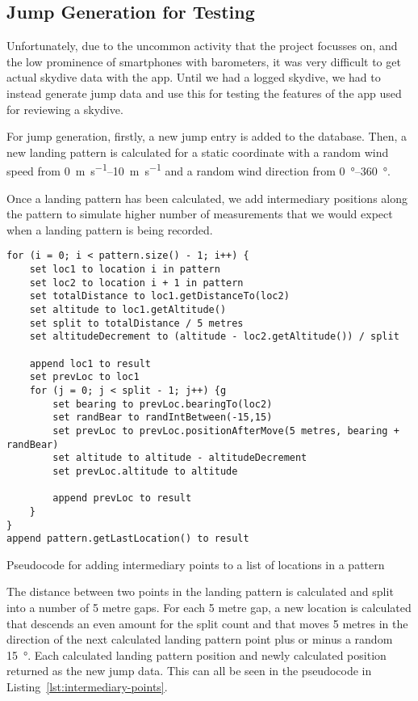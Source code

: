 \subsection{Jump Generation for Testing}
Unfortunately, due to the uncommon activity that the project focusses on, and the low prominence of smartphones with barometers, it was very difficult to get actual skydive data with the app. Until we had a logged skydive, we had to instead generate jump data and use this for testing the features of the app used for reviewing a skydive.

For jump generation, firstly, a new jump entry is added to the database. Then, a new landing pattern is calculated for a static coordinate with a random wind speed from \SIrange{0}{10}{\metre\per\second} and a random wind direction from \SIrange{0}{360}{\degree}.

Once a landing pattern has been calculated, we add intermediary positions along the pattern to simulate higher number of measurements that we would expect when a landing pattern is being recorded.

\begin{listing}
  \centering
  \begin{lstlisting}[style=code]
for (i = 0; i < pattern.size() - 1; i++) {
    set loc1 to location i in pattern
    set loc2 to location i + 1 in pattern
    set totalDistance to loc1.getDistanceTo(loc2)
    set altitude to loc1.getAltitude()
    set split to totalDistance / 5 metres
    set altitudeDecrement to (altitude - loc2.getAltitude()) / split

    append loc1 to result
    set prevLoc to loc1
    for (j = 0; j < split - 1; j++) {g
        set bearing to prevLoc.bearingTo(loc2)
        set randBear to randIntBetween(-15,15)
        set prevLoc to prevLoc.positionAfterMove(5 metres, bearing + randBear)
        set altitude to altitude - altitudeDecrement
        set prevLoc.altitude to altitude

        append prevLoc to result
    }
}
append pattern.getLastLocation() to result
  \end{lstlisting}
  \caption{Pseudocode for adding intermediary points to a list of locations in a pattern}\label{lst:intermediary-points}
\end{listing}

The distance between two points in the landing pattern is calculated and split into a number of 5 metre gaps. For each 5 metre gap, a new location is calculated that descends an even amount for the split count and that moves 5 metres in the direction of the next calculated landing pattern point plus or minus a random \SI{15}{\degree}. Each calculated landing pattern position and newly calculated position returned as the new jump data. This can all be seen in the pseudocode in Listing~\vref{lst:intermediary-points}.

